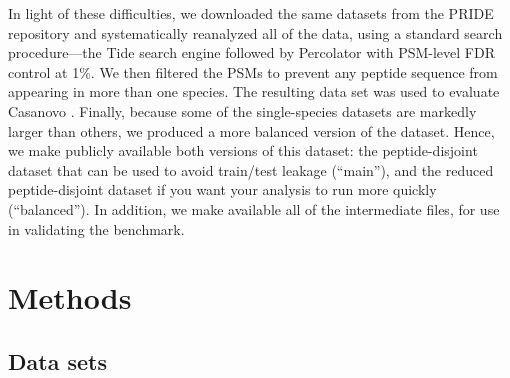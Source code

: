 \documentclass{article}
\begin{document}
In light of these difficulties, we downloaded the same datasets from the PRIDE repository and systematically reanalyzed all of the data, using a standard search procedure---the Tide search engine \cite{diament2011faster} followed by Percolator \cite{kall2007semi-supervised} with PSM-level FDR control at 1\%.
We then filtered the PSMs to prevent any peptide sequence from appearing in more than one species.
The resulting data set was used to evaluate Casanovo \cite{yilmaz2024sequence}.
Finally, because some of the single-species datasets are markedly larger than others, we produced a more balanced version of the dataset.
Hence, we make publicly available both versions of this dataset: the peptide-disjoint dataset that can be used to avoid train/test leakage (``main''), and the reduced peptide-disjoint dataset if you want your analysis to run more quickly (``balanced'').
In addition, we make available all of the intermediate files, for use in validating the benchmark.

\section*{Methods}

\subsection*{Data sets}


\end{document}
